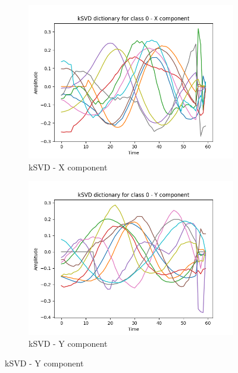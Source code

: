 \documentclass[11pt]{article}
\begin{document}
\begin{figure}[!ht]
    \centering
    \begin{subfigure}[b]{0.49\textwidth}
      \includegraphics[width=\textwidth]{../../figures/kSVD_dictionnary_DIGITS_class_0_X.png}
      \caption*{kSVD - X component}
    \end{subfigure}
    \begin{subfigure}[b]{0.49\textwidth}
        \includegraphics[width=\textwidth]{../../figures/kSVD_dictionnary_DIGITS_class_0_Y.png}
        \caption*{kSVD - Y component}
      \end{subfigure}


\end{figure}
\end{document}
